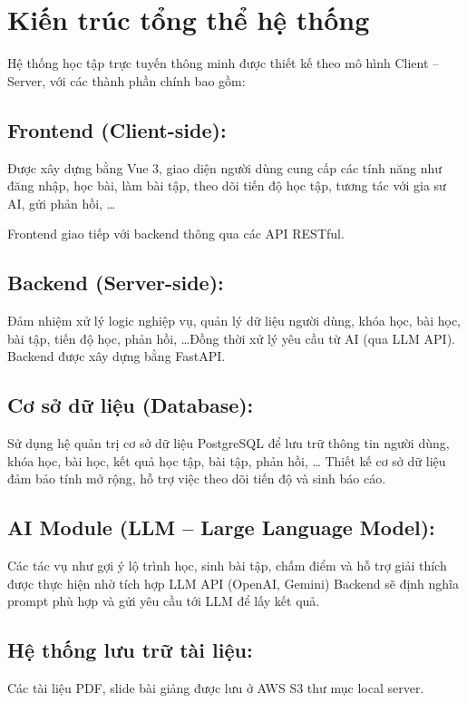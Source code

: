 \section{Kiến trúc tổng thể hệ thống}
Hệ thống học tập trực tuyến thông minh được thiết kế theo mô hình Client – Server, với các thành phần chính bao gồm:

\subsection{Frontend (Client-side):}
Được xây dựng bằng Vue 3, giao diện người dùng cung cấp các tính năng như đăng nhập, học bài, làm bài tập, theo dõi tiến độ học tập, tương tác với gia sư AI, gửi phản hồi, \dots

Frontend giao tiếp với backend thông qua các API RESTful.

\subsection{Backend (Server-side):}
Đảm nhiệm xử lý logic nghiệp vụ, quản lý dữ liệu người dùng, khóa học, bài học, bài tập, tiến độ học, phản hồi, \dots Đồng thời xử lý yêu cầu từ AI (qua LLM API).
Backend được xây dựng bằng FastAPI. 
\subsection{Cơ sở dữ liệu (Database):}
Sử dụng hệ quản trị cơ sở dữ liệu PostgreSQL để lưu trữ thông tin người dùng, khóa học, bài học, kết quả học tập, bài tập, phản hồi, \dots
Thiết kế cơ sở dữ liệu đảm bảo tính mở rộng, hỗ trợ việc theo dõi tiến độ và sinh báo cáo.

\subsection{AI Module (LLM – Large Language Model):}
Các tác vụ như gợi ý lộ trình học, sinh bài tập, chấm điểm và hỗ trợ giải thích được thực hiện nhờ tích hợp LLM API (OpenAI, Gemini)
Backend sẽ định nghĩa prompt phù hợp và gửi yêu cầu tới LLM để lấy kết quả.

\subsection{Hệ thống lưu trữ tài liệu:}
Các tài liệu PDF, slide bài giảng được lưu ở AWS S3 thư mục local server.

